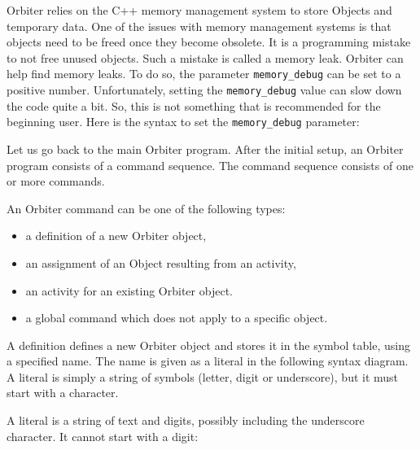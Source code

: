 Orbiter relies on the C++ memory management system to store Objects and temporary data. 
One of the issues with memory management systems is that objects need to be freed once they become obsolete. 
It is a programming mistake to not free unused objects. Such a mistake is called a memory leak. 
Orbiter  can help find  memory leaks. To do so, the parameter \verb'memory_debug' can be set to a positive number. 
Unfortunately, setting the \verb'memory_debug' value can slow down the code quite a bit. 
So, this is not something that is recommended for the beginning user. 
Here is the syntax to set the \verb'memory_debug' parameter:




\bigskip

Let us go back to the main Orbiter program. 
After the initial setup, an Orbiter program consists of a command sequence.
The command sequence consists of one or more commands.



An Orbiter command can be one of the following types:
\begin{itemize}
\item 
a definition of a new Orbiter object,
\item
an assignment of an Object resulting from an activity, 
\item
an activity for an existing Orbiter object.
\item
a global command which does not apply to a specific object.
\end{itemize}



A definition defines a new Orbiter object and stores it 
in the symbol table, using a specified name. 
The name is given as a literal in the following syntax diagram.
A literal is simply a string of symbols (letter, digit or underscore), 
but it must start with a character. 









\bigskip


A literal is a string of text and digits, 
possibly including the underscore character. 
It cannot start with a digit:



